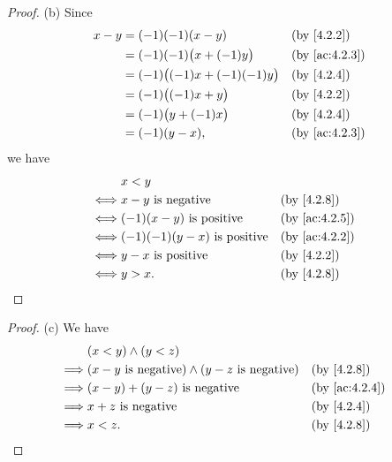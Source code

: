 \begin{proof}{(b)}
  Since
  \begin{align*}
    x - y & = (-1)(-1)(x - y)                 &  & \text{(by \cref{4.2.2})}    \\
          & = (-1)(-1)\big(x + (-1)y\big)     &  & \text{(by \cref{ac:4.2.3})} \\
          & = (-1)\big((-1)x + (-1)(-1)y\big) &  & \text{(by \cref{4.2.4})}    \\
          & = (-1)\big((-1)x + y\big)         &  & \text{(by \cref{4.2.2})}    \\
          & = (-1)\big(y + (-1)x\big)         &  & \text{(by \cref{4.2.4})}    \\
          & = (-1)(y - x),                    &  & \text{(by \cref{ac:4.2.3})}
  \end{align*}
  we have
  \begin{align*}
         & x < y                                                                \\
    \iff & x - y \text{ is negative}           &  & \text{(by \cref{4.2.8})}    \\
    \iff & (-1)(x - y) \text{ is positive}     &  & \text{(by \cref{ac:4.2.5})} \\
    \iff & (-1)(-1)(y - x) \text{ is positive} &  & \text{(by \cref{ac:4.2.2})} \\
    \iff & y - x \text{ is positive}           &  & \text{(by \cref{4.2.2})}    \\
    \iff & y > x.                              &  & \text{(by \cref{4.2.8})}
  \end{align*}
\end{proof}

\begin{proof}{(c)}
  We have
  \begin{align*}
             & (x < y) \land (y < z)                                                                          \\
    \implies & (x - y \text{ is negative}) \land (y - z \text{ is negative}) &  & \text{(by \cref{4.2.8})}    \\
    \implies & (x - y) + (y - z) \text{ is negative}                         &  & \text{(by \cref{ac:4.2.4})} \\
    \implies & x + z \text{ is negative}                                     &  & \text{(by \cref{4.2.4})}    \\
    \implies & x < z.                                                        &  & \text{(by \cref{4.2.8})}
  \end{align*}
\end{proof}

